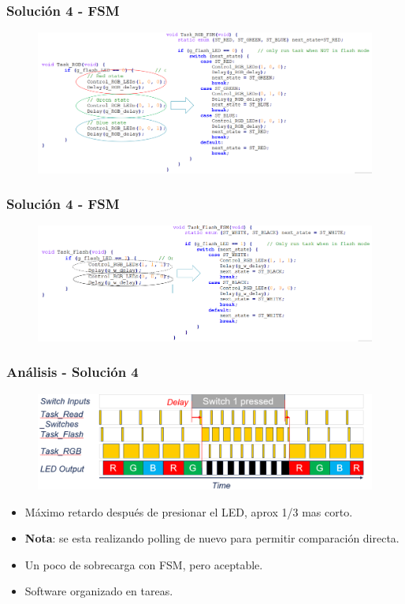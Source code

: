 \documentclass[10.5pt,scale=1.0,t,aspectratio=169,hyperref={pdfpagelabels=false}]{beamer}
\begin{document}
\begin{frame}
	\frametitle{Solución 4 - FSM}
	\begin{figure}
		\centering
		\includegraphics[scale=0.4]{14_TaskToFSM}
	\end{figure}
\end{frame}
\begin{frame}
	\frametitle{Solución 4 - FSM}
	\begin{figure}
		\centering
		\includegraphics[scale=0.4]{15_TaskFlashFSM}
	\end{figure}
\end{frame}
\begin{frame}
	\frametitle{Análisis - Solución 4}
	\begin{figure}
		\centering
		\includegraphics[scale=0.4]{16_TimingSolution4}
	\end{figure}
	\begin{itemize}
		\item Máximo retardo después de presionar el LED, aprox 1/3 mas corto. 
		\item \textbf{Nota}: se esta realizando polling de nuevo para permitir comparación directa. 
		\item Un poco de sobrecarga con FSM, pero aceptable.
		\item Software organizado en tareas. 
	\end{itemize}
\end{frame}
\end{document}
